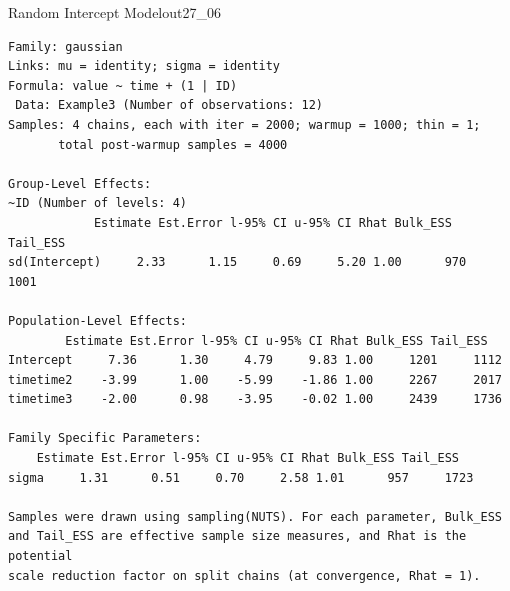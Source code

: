\begin{Rscreen}{Random Intercept Model}{out27_06}
	\begin{verbatim}
Family: gaussian 
Links: mu = identity; sigma = identity 
Formula: value ~ time + (1 | ID) 
 Data: Example3 (Number of observations: 12) 
Samples: 4 chains, each with iter = 2000; warmup = 1000; thin = 1;
       total post-warmup samples = 4000

Group-Level Effects: 
~ID (Number of levels: 4) 
            Estimate Est.Error l-95% CI u-95% CI Rhat Bulk_ESS Tail_ESS
sd(Intercept)     2.33      1.15     0.69     5.20 1.00      970     1001

Population-Level Effects: 
        Estimate Est.Error l-95% CI u-95% CI Rhat Bulk_ESS Tail_ESS
Intercept     7.36      1.30     4.79     9.83 1.00     1201     1112
timetime2    -3.99      1.00    -5.99    -1.86 1.00     2267     2017
timetime3    -2.00      0.98    -3.95    -0.02 1.00     2439     1736

Family Specific Parameters: 
    Estimate Est.Error l-95% CI u-95% CI Rhat Bulk_ESS Tail_ESS
sigma     1.31      0.51     0.70     2.58 1.01      957     1723

Samples were drawn using sampling(NUTS). For each parameter, Bulk_ESS
and Tail_ESS are effective sample size measures, and Rhat is the potential
scale reduction factor on split chains (at convergence, Rhat = 1).
\end{verbatim}
\end{Rscreen}
